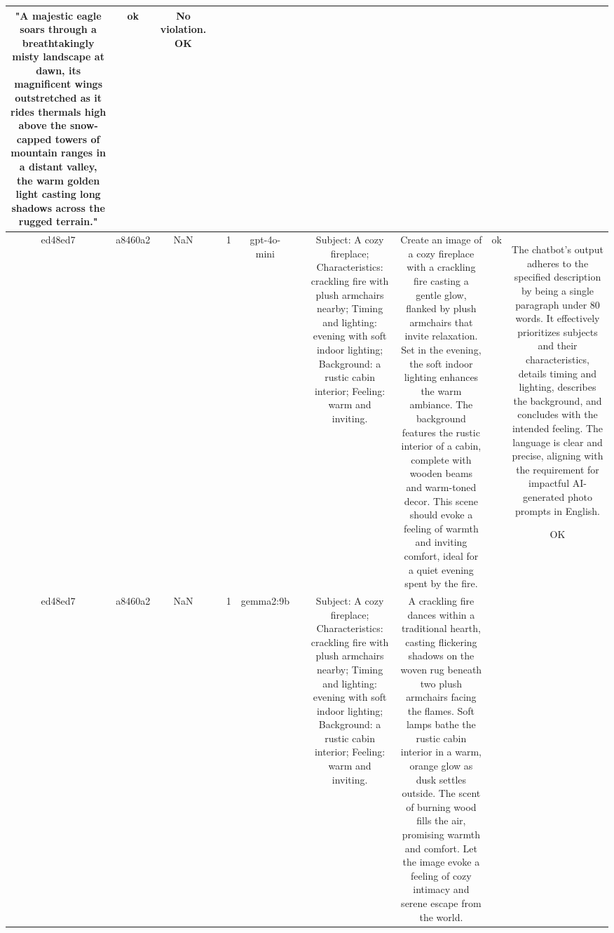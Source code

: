 \begin{table}[h!]
\begin{tabular}{|c|c|c|c|c|c|c|c|c|c|c|}
"A majestic eagle soars through a breathtakingly misty landscape at dawn, its magnificent wings outstretched as it rides thermals high above the snow-capped towers of mountain ranges in a distant valley, the warm golden light casting long shadows across the rugged terrain." & ok & No violation.
OK\\
\hline
ed48ed7 & a8460a2 & NaN &  & 1 & gpt-4o-mini &  & Subject: A cozy fireplace; Characteristics: crackling fire with plush armchairs nearby; Timing and lighting: evening with soft indoor lighting; Background: a rustic cabin interior; Feeling: warm and inviting. & Create an image of a cozy fireplace with a crackling fire casting a gentle glow, flanked by plush armchairs that invite relaxation. Set in the evening, the soft indoor lighting enhances the warm ambiance. The background features the rustic interior of a cabin, complete with wooden beams and warm-toned decor. This scene should evoke a feeling of warmth and inviting comfort, ideal for a quiet evening spent by the fire. & ok & The chatbot's output adheres to the specified description by being a single paragraph under 80 words. It effectively prioritizes subjects and their characteristics, details timing and lighting, describes the background, and concludes with the intended feeling. The language is clear and precise, aligning with the requirement for impactful AI-generated photo prompts in English.

OK\\
\hline
ed48ed7 & a8460a2 & NaN &  & 1 & gemma2:9b &  & Subject: A cozy fireplace; Characteristics: crackling fire with plush armchairs nearby; Timing and lighting: evening with soft indoor lighting; Background: a rustic cabin interior; Feeling: warm and inviting. & A crackling fire dances within a traditional hearth, casting flickering shadows on the woven rug beneath two plush armchairs facing the flames. Soft lamps bathe the rustic cabin interior in a warm, orange glow as dusk settles outside. The scent of burning wood fills the air, promising warmth and comfort. Let the image evoke a feeling of cozy intimacy and serene escape from the world. 



\end{tabular}
\end{table}
